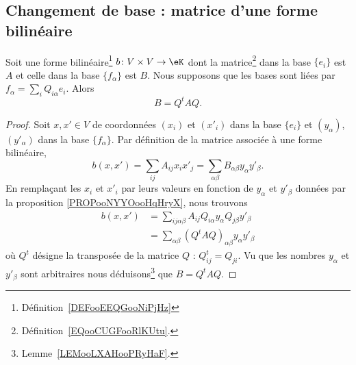 \subsection{Changement de base : matrice d'une forme bilinéaire}

\begin{proposition}     \label{PROPooLBIOooUpzxXA}
	Soit une forme bilinéaire\footnote{Définition~\ref{DEFooEEQGooNiPjHz}} \( b\colon V\times V\to \eK\) dont la matrice\footnote{Définition~\ref{EQooCUGFooRlKUtu}.} dans la base \( \{ e_i \}\) est \( A\) et celle dans la base \( \{ f_{\alpha} \}\) est \( B\). Nous supposons que les bases sont liées par \( f_{\alpha}=\sum_{i}Q_{i\alpha}e_i\). Alors
	\begin{equation}        \label{EQooZUVTooKjqnJj}
		B=Q^tAQ.
	\end{equation}
\end{proposition}

\begin{proof}
	Soit \( x,x'\in V\) de coordonnées \( (x_i)\) et \( (x'_i)\) dans la base \( \{ e_i \}\) et \( (y_{\alpha})\), \( (y'_{\alpha})\) dans la base \( \{ f_{\alpha} \}\). Par définition de la matrice associée à une forme bilinéaire,
	\begin{equation}
		b(x,x')=\sum_{ij}A_{ij}x_ix'_j=\sum_{\alpha\beta}B_{\alpha\beta}y_{\alpha}y'_{\beta}.
	\end{equation}
	En remplaçant les \( x_i\) et \( x'_i\) par leurs valeurs en fonction de \( y_{\alpha}\) et \( y'_{\beta}\) données par la proposition \ref{PROPooNYYOooHqHryX}, nous trouvons
	\begin{subequations}
		\begin{align}
			b(x,x') & =\sum_{ij\alpha\beta}A_{ij}Q_{i\alpha}y_{\alpha}Q_{j\beta}y'_{\beta} \\
			        & =\sum_{\alpha\beta}(Q^tAQ)_{\alpha\beta}y_{\alpha}y'_{\beta}
		\end{align}
	\end{subequations}
	où \( Q^t\) désigne la transposée de la matrice \( Q\) :  \( Q^t_{ij}=Q_{ji}\). Vu que les nombres \( y_{\alpha}\) et \( y'_{\beta}\) sont arbitraires nous déduisons\footnote{Lemme~\ref{LEMooLXAHooPRyHaF}.} que \( B=Q^tAQ\).
\end{proof}

